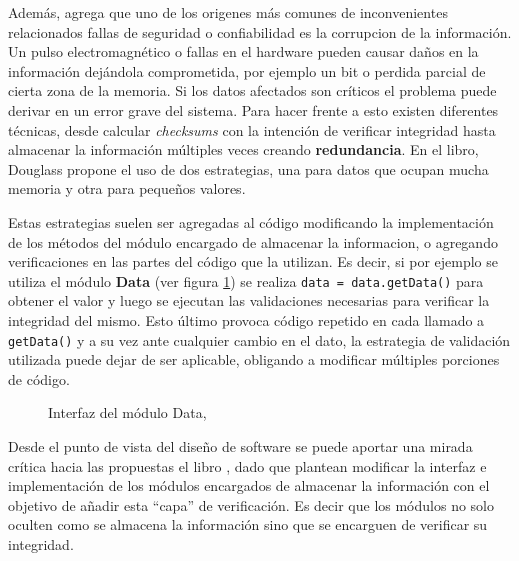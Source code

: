 Además, agrega que uno de los origenes más comunes de inconvenientes relacionados fallas de seguridad o confiabilidad es la corrupcion de la información. Un pulso electromagnético o fallas en el hardware pueden causar daños en la información dejándola comprometida, por ejemplo un \gls{bit} o perdida parcial de cierta zona de la memoria. Si los datos afectados son críticos el problema puede derivar en un error grave del sistema. Para hacer frente a esto existen diferentes técnicas, desde calcular \textit{checksums} con la intención de verificar integridad hasta almacenar la información múltiples veces creando \textbf{redundancia}. En el libro, Douglass propone el uso de dos estrategias, una para datos que ocupan mucha memoria y otra para pequeños valores.

Estas estrategias suelen ser agregadas al código modificando la implementación de los métodos del módulo encargado de almacenar la informacion, o agregando verificaciones en las partes del código que la utilizan. Es decir, si por ejemplo se utiliza el módulo \textbf{Data} (ver figura \ref{dataInter}) se realiza \verb|data = data.getData()| para obtener el valor y luego se ejecutan las validaciones necesarias para verificar la integridad del mismo. 
Esto último provoca código repetido en cada llamado a \verb|getData()| y a su vez ante cualquier cambio en el dato, la estrategia de validación utilizada puede dejar de ser aplicable, obligando a modificar múltiples porciones de código.

\begin{figure}[H]
\caption{Interfaz del módulo Data,}
\label{dataInter}
\begin{center}
\end{center}
\end{figure}

Desde el punto de vista del diseño de software se puede aportar una mirada crítica hacia las propuestas el libro \cite[pág. 357]{douglass}, dado que plantean modificar la interfaz e implementación de los módulos encargados de almacenar la información con el objetivo de añadir esta ``capa'' de verificación. Es decir que los módulos no solo oculten como se almacena la información sino que se encarguen de verificar su integridad. 

